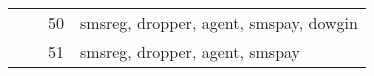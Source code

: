 \begin{table*}
\begin{minipage}{\textwidth}
\begin{center}
\begin{tabular}{llcl}
                                                   &                                         & 50                   & smsreg, dropper, agent, smspay, dowgin               \\
                                                   &                                         & 51                   & smsreg, dropper, agent, smspay                       \\ \hline
\end{tabular}
\end{center}
\bigskip\centering
\end{minipage}
\end{table*}%

%
%


